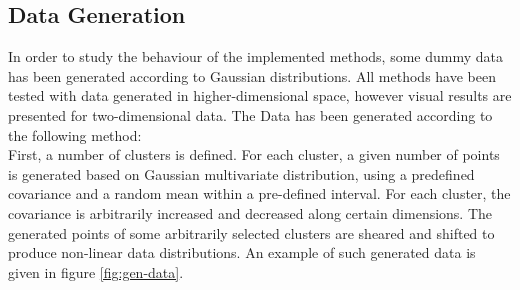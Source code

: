 \documentclass{article}
\begin{document}
\subsection{Data Generation}
In order to study the behaviour of the implemented methods, some dummy data has been generated according to Gaussian distributions. All methods have been tested with data generated in higher-dimensional space, however visual results are presented for two-dimensional data. The Data has been generated according to the following method:\\

First, a number of clusters is defined. For each cluster, a given number of points is generated based on Gaussian multivariate distribution, using a predefined covariance and a random mean within a pre-defined interval. For each cluster, the covariance is arbitrarily increased and decreased along certain dimensions. The generated points of some arbitrarily selected clusters are sheared and shifted to produce non-linear data distributions. An example of such generated data is given in figure \ref{fig:gen-data}.
\end{document}
